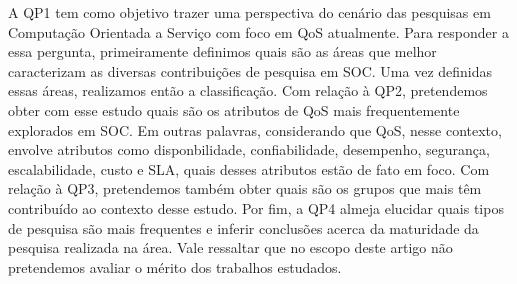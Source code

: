 A QP1 tem como objetivo trazer uma perspectiva do cen\'{a}rio das pesquisas em Computa\c{c}\~{a}o Orientada a Servi\c{c}o com foco em QoS atualmente. Para responder a essa pergunta, primeiramente definimos quais s\~{a}o as \'{a}reas que melhor caracterizam as diversas contribui\c{c}\~{o}es de pesquisa em SOC. Uma vez definidas essas \'{a}reas, realizamos ent\~{a}o a classifica\c{c}\~{a}o. Com rela\c{c}\~{a}o \`{a} QP2, pretendemos obter com esse estudo quais s\~{a}o os atributos de QoS mais frequentemente explorados em SOC. Em outras palavras, considerando que QoS, nesse contexto, envolve atributos como disponbilidade, confiabilidade, desempenho, seguran\c{c}a, escalabilidade, custo e SLA, quais desses atributos est\~{a}o de fato em foco. Com rela\c{c}\~{a}o \`{a} QP3, pretendemos tamb\'{e}m obter quais s\~{a}o os grupos que mais t\^{e}m contribu\'{i}do ao contexto desse estudo. Por fim, a QP4 almeja elucidar quais tipos de pesquisa s\~{a}o mais frequentes e inferir conclusões acerca da maturidade da pesquisa realizada na \'{a}rea. Vale ressaltar que no escopo deste artigo n\~{a}o pretendemos avaliar o m\'{e}rito dos trabalhos estudados.


